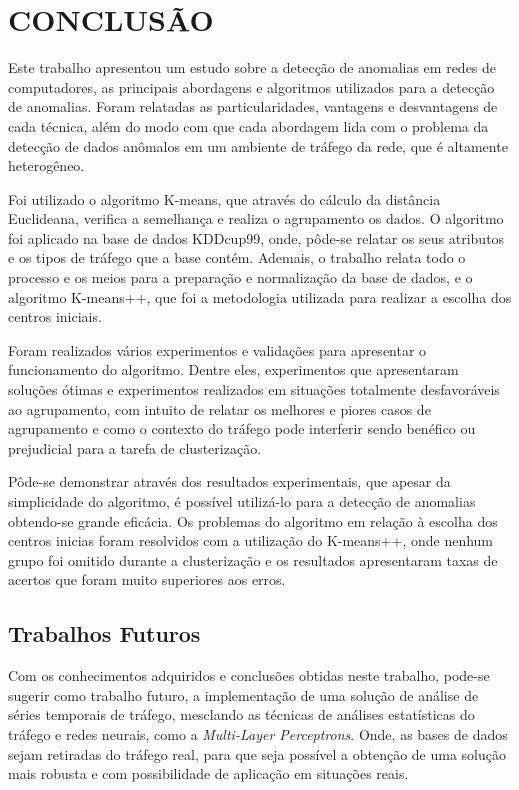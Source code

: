 \chapter{CONCLUSÃO}

\indent Este trabalho apresentou um estudo sobre a detecção de anomalias em redes de computadores, as principais abordagens e algoritmos utilizados para a detecção de anomalias. Foram relatadas as particularidades, vantagens e desvantagens de cada técnica, além do modo com que cada abordagem lida com o problema da detecção de dados anômalos em um ambiente de tráfego da rede, que é altamente heterogêneo.

\indent Foi utilizado o algoritmo K-means, que através do cálculo da distância Euclideana, verifica a semelhança e realiza o agrupamento os dados. O algoritmo foi aplicado na base de dados KDDcup99, onde, pôde-se relatar os seus atributos e os tipos de tráfego que a base contém. Ademais, o trabalho relata todo o processo e os meios para a preparação e normalização da base de dados, e o algoritmo K-means++, que foi a metodologia utilizada para realizar a escolha dos centros iniciais.

\indent Foram realizados vários experimentos e validações para apresentar o funcionamento do algoritmo. Dentre eles, experimentos que apresentaram soluções ótimas e experimentos realizados em situações totalmente desfavoráveis ao agrupamento, com intuito de relatar os melhores e piores casos de agrupamento e como o contexto do tráfego pode interferir sendo benéfico ou prejudicial para a tarefa de clusterização.

\indent Pôde-se demonstrar através dos resultados experimentais, que apesar da simplicidade do algoritmo, é possível utilizá-lo para a detecção de anomalias obtendo-se grande eficácia. Os problemas do algoritmo em relação à escolha dos centros inicias foram resolvidos com a utilização do K-means++, onde nenhum grupo foi omitido durante a clusterização e os resultados apresentaram taxas de acertos que foram muito superiores aos erros.


\section{Trabalhos Futuros}

\indent Com os conhecimentos adquiridos e conclusões obtidas neste trabalho, pode-se sugerir como trabalho futuro, a implementação de uma solução de análise de séries temporais de tráfego, mesclando as técnicas de análises estatísticas do tráfego e redes neurais, como a \textit{Multi-Layer Perceptrons}. Onde, as bases de dados sejam retiradas do tráfego real, para que seja possível a obtenção de uma solução mais robusta e com possibilidade de aplicação em situações reais.
